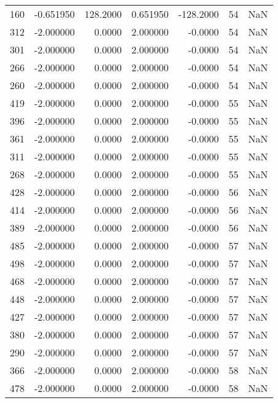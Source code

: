 \begin{tabular}{rrrrrrr}
160 &   -0.651950 &  128.2000 &    0.651950 &   -128.2000 &          54 & NaN \\
312 &   -2.000000 &    0.0000 &    2.000000 &     -0.0000 &          54 & NaN \\
301 &   -2.000000 &    0.0000 &    2.000000 &     -0.0000 &          54 & NaN \\
266 &   -2.000000 &    0.0000 &    2.000000 &     -0.0000 &          54 & NaN \\
260 &   -2.000000 &    0.0000 &    2.000000 &     -0.0000 &          54 & NaN \\
419 &   -2.000000 &    0.0000 &    2.000000 &     -0.0000 &          55 & NaN \\
396 &   -2.000000 &    0.0000 &    2.000000 &     -0.0000 &          55 & NaN \\
361 &   -2.000000 &    0.0000 &    2.000000 &     -0.0000 &          55 & NaN \\
311 &   -2.000000 &    0.0000 &    2.000000 &     -0.0000 &          55 & NaN \\
268 &   -2.000000 &    0.0000 &    2.000000 &     -0.0000 &          55 & NaN \\
428 &   -2.000000 &    0.0000 &    2.000000 &     -0.0000 &          56 & NaN \\
414 &   -2.000000 &    0.0000 &    2.000000 &     -0.0000 &          56 & NaN \\
389 &   -2.000000 &    0.0000 &    2.000000 &     -0.0000 &          56 & NaN \\
485 &   -2.000000 &    0.0000 &    2.000000 &     -0.0000 &          57 & NaN \\
498 &   -2.000000 &    0.0000 &    2.000000 &     -0.0000 &          57 & NaN \\
468 &   -2.000000 &    0.0000 &    2.000000 &     -0.0000 &          57 & NaN \\
448 &   -2.000000 &    0.0000 &    2.000000 &     -0.0000 &          57 & NaN \\
427 &   -2.000000 &    0.0000 &    2.000000 &     -0.0000 &          57 & NaN \\
380 &   -2.000000 &    0.0000 &    2.000000 &     -0.0000 &          57 & NaN \\
290 &   -2.000000 &    0.0000 &    2.000000 &     -0.0000 &          57 & NaN \\
366 &   -2.000000 &    0.0000 &    2.000000 &     -0.0000 &          58 & NaN \\
478 &   -2.000000 &    0.0000 &    2.000000 &     -0.0000 &          58 & NaN \\

\end{tabular}
